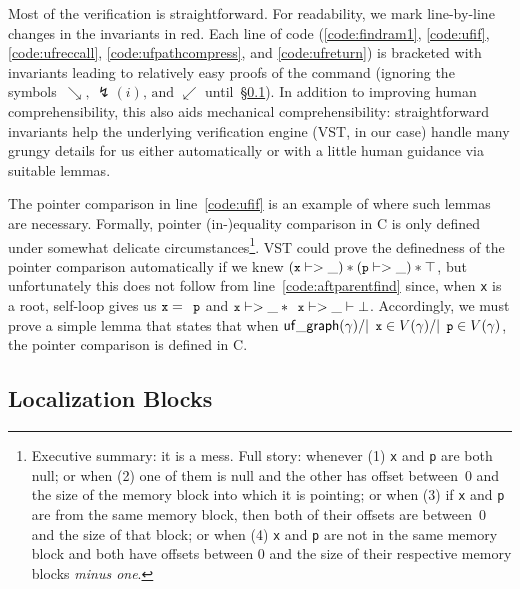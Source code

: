 \documentclass[acmsmall,screen]{acmart}
\newcommand{\li}[1]{{\texttt{\small #1}}}
\newcommand{\p}[1]{\ensuremath{\mathsf{#1}}} \newcommand{\m}[1]{\ensuremath{\mathit{#1}}} \newcommand{\ma}[1]{\ensuremath{\mathcal{#1}}} \let\ramify\lightning
\begin{document}
Most of the verification is straightforward. For readability, we mark 
line-by-line changes in the invariants in {\color{red}red}.
Each line of code
(\ref{code:findram1}, \ref{code:ufif}, \ref{code:ufreccall}, \ref{code:ufpathcompress},
and \ref{code:ufreturn}) is bracketed with invariants leading to relatively easy proofs
of the command (ignoring the symbols~$\searrow \text{, } \ramify(i) \text{, and }
\swarrow$ until~\S\ref{sec:localblocks}).
In addition to improving human comprehensibility, this
also aids mechanical comprehensibility: straightforward
invariants help the underlying verification engine (VST, in our case) handle many grungy
details for us either automatically or with a little human guidance via suitable lemmas.

The pointer comparison in line~\ref{code:ufif} is an example of where
such lemmas are necessary.
Formally, pointer (in-)equality comparison in C is only defined under somewhat delicate
circumstances\footnote{\label{footnote:pointereq}Executive summary: it is a mess. Full story:
whenever (1) \li{x} and \li{p} are both null; or when (2) one of them is null and the
other has offset between~0 and the size of the memory block into which it is pointing;
or when (3) if \li{x} and \li{p} are from the same memory block, then both of their
offsets are between~0 and the size of that block; or when (4) \li{x} and \li{p} are
not in the same memory block and both have offsets between 0 and the size of their
respective memory blocks \emph{minus one}.}.  VST could prove the definedness of the
pointer comparison automatically if we knew
\mbox{$(\li{x} |-> \_) * (\li{p} |-> \_) * \top$}, but
unfortunately this does not follow from line~\ref{code:aftparentfind} since,
when \li{x} is a root, self-loop gives us $\li{x}=\li{p}$ and
$\li{x} |-> \_ * \li{x} |-> \_ |- \bot$.  Accordingly, we must prove a
simple lemma that states that when $\p{uf\_graph}(\gamma) /| \li{x}
\in V(\gamma) /| \li{p} \in V(\gamma)$,
the pointer comparison is defined in C.

\subsection{Localization Blocks}
\label{sec:localblocks}
\end{document}
